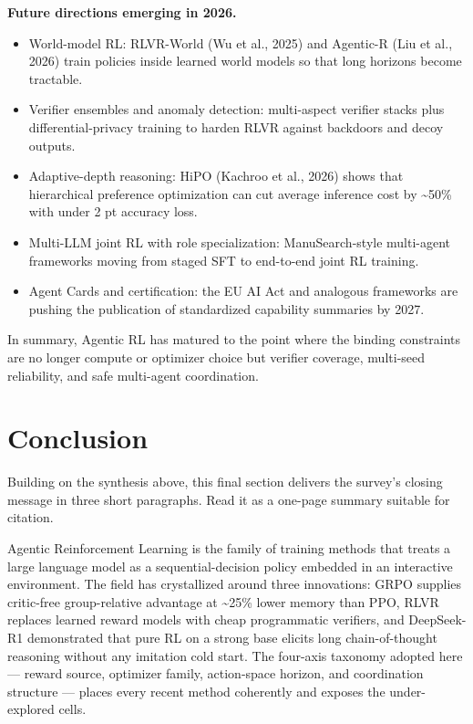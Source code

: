 \textbf{Future directions emerging in 2026.}

\begin{itemize}
\tightlist
\item
  World-model RL: RLVR-World (Wu et al., 2025) and Agentic-R (Liu et al., 2026) train policies inside learned world models so that long horizons become tractable.
\item
  Verifier ensembles and anomaly detection: multi-aspect verifier stacks plus differential-privacy training to harden RLVR against backdoors and decoy outputs.
\item
  Adaptive-depth reasoning: HiPO (Kachroo et al., 2026) shows that hierarchical preference optimization can cut average inference cost by \textasciitilde50\% with under 2 pt accuracy loss.
\item
  Multi-LLM joint RL with role specialization: ManuSearch-style multi-agent frameworks moving from staged SFT to end-to-end joint RL training.
\item
  Agent Cards and certification: the EU AI Act and analogous frameworks are pushing the publication of standardized capability summaries by 2027.
\end{itemize}

In summary, Agentic RL has matured to the point where the binding constraints are no longer compute or optimizer choice but verifier coverage, multi-seed reliability, and safe multi-agent coordination.

\section{Conclusion}\label{conclusion}

Building on the synthesis above, this final section delivers the survey's closing message in three short paragraphs. Read it as a one-page summary suitable for citation.

Agentic Reinforcement Learning is the family of training methods that treats a large language model as a sequential-decision policy embedded in an interactive environment. The field has crystallized around three innovations: GRPO supplies critic-free group-relative advantage at \textasciitilde25\% lower memory than PPO, RLVR replaces learned reward models with cheap programmatic verifiers, and DeepSeek-R1 demonstrated that pure RL on a strong base elicits long chain-of-thought reasoning without any imitation cold start. The four-axis taxonomy adopted here --- reward source, optimizer family, action-space horizon, and coordination structure --- places every recent method coherently and exposes the under-explored cells.

